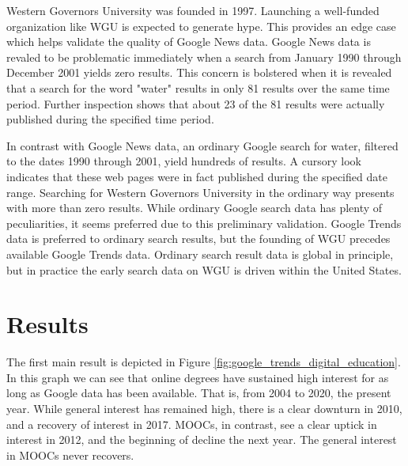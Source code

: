 \documentclass[review]{elsarticle}
\begin{document}
Western Governors University was founded in 1997.
Launching a well-funded organization like WGU is expected to generate hype.
This provides an edge case which helps validate the quality of Google News data.
Google News data is revaled to be problematic immediately when a search from January 1990 through December 2001 yields zero results.
This concern is bolstered when it is revealed that a search for the word "water" results in only 81 results over the same time period.
Further inspection shows that about 23 of the 81 results were actually published during the specified time period.

In contrast with Google News data, an ordinary Google search for water, filtered to the dates 1990 through 2001, yield hundreds of results.
A cursory look indicates that these web pages were in fact published during the specified date range.
Searching for Western Governors University in the ordinary way presents with more than zero results.
While ordinary Google search data has plenty of peculiarities, it seems preferred due to this preliminary validation.
Google Trends data is preferred to ordinary search results, but the founding of WGU precedes available Google Trends data.
Ordinary search result data is global in principle, but in practice the early search data on WGU is driven within the United States.

\section{Results}

The first main result is depicted in Figure \ref{fig:google_trends_digital_education}.
In this graph we can see that online degrees have sustained high interest for as long as Google data has been available.
That is, from 2004 to 2020, the present year.
While general interest has remained high, there is a clear downturn in 2010, and a recovery of interest in 2017.
MOOCs, in contrast, see a clear uptick in interest in 2012, and the beginning of decline the next year.
The general interest in MOOCs never recovers.
\end{document}
